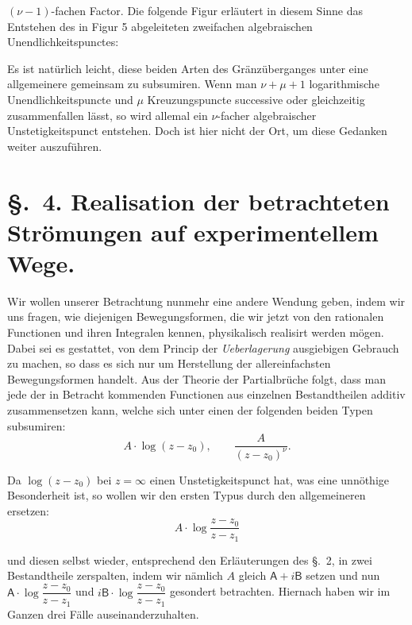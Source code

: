 \documentclass{article}
\begin{document}
$(\nu - 1)$-fachen Factor. Die folgende Figur erläutert in diesem Sinne das Entstehen des in Figur 5 abgeleiteten zweifachen algebraischen Unendlichkeitspunctes:


Es ist natürlich leicht, diese beiden Arten des Gränzüberganges unter eine allgemeinere gemeinsam zu subsumiren. Wenn man $\nu + \mu + 1$ logarithmische Unendlichkeitspuncte und $\mu$ Kreuzungspuncte successive oder gleichzeitig zusammenfallen lässt, so wird allemal ein $\nu$-facher algebraischer Unstetigkeitspunct entstehen. Doch ist hier nicht der Ort, um diese Gedanken weiter auszuführen.

\section*{§.~4. Realisation der betrachteten Strömungen auf experimentellem Wege.}

Wir wollen unserer Betrachtung nunmehr eine andere Wendung geben, indem wir uns fragen, wie diejenigen Bewegungsformen, die wir jetzt von den rationalen Functionen und ihren Integralen kennen, physikalisch realisirt werden mögen. Dabei sei es gestattet, von dem Princip der \emph{Ueberlagerung} ausgiebigen Gebrauch zu machen, so dass es sich nur um Herstellung der allereinfachsten Bewegungsformen handelt. Aus der Theorie der Partialbrüche folgt, dass man jede der in Betracht kommenden Functionen aus einzelnen Bestandtheilen additiv zusammensetzen kann, welche sich unter einen der folgenden beiden Typen subsumiren:
\[ A \cdot \log (z - z_{0}), \qquad \frac{A}{(z - z_{0})^{\nu}}. \]

Da $\log (z - z_{0})$ bei $z = \infty$ einen Unstetigkeitspunct hat, was eine unnöthige Besonderheit ist, so wollen wir den ersten Typus durch den allgemeineren ersetzen:
\[ A \cdot \log \frac{z - z_{0}}{z - z_{1}} \]

und diesen selbst wieder, entsprechend den Erläuterungen des §.~2, in zwei Bestandtheile zerspalten, indem wir nämlich $A$ gleich $\mathsf{A} + i\mathsf{B}$ setzen und nun $\mathsf{A} \cdot \log \dfrac{z - z_{0}}{z - z_{1}}$ und $i\mathsf{B} \cdot \log \dfrac{z - z_{0}}{z - z_{1}}$ gesondert betrachten. Hiernach haben wir im Ganzen drei Fälle auseinanderzuhalten.
\end{document}
